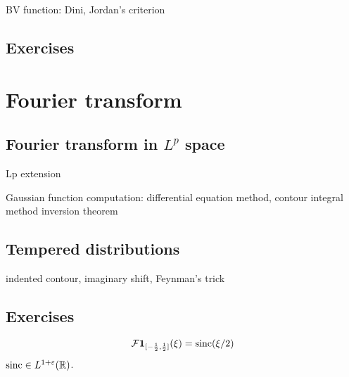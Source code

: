 \documentclass{../../large}
\begin{document}
BV function: Dini, Jordan's criterion
\begin{prb}
\end{prb}





\section*{Exercises}
\begin{prb}
\end{prb}
\begin{prb}
\end{prb}









\chapter{Fourier transform}
\section{Fourier transform in $L^p$ space}
\begin{prb}
\end{prb}
Lp extension

Gaussian function computation: differential equation method, contour integral method
inversion theorem
\begin{prb}
\end{prb}

\section{Tempered distributions}
\begin{prb}
indented contour, imaginary shift, Feynman's trick
\end{prb}







\section*{Exercises}
\begin{prb}
\[\mathcal{F}\mathbf{1}_{[-\frac12,\frac12]}(\xi)=\operatorname{sinc}(\xi/2)\]
$\operatorname{sinc}\in L^{1+\varepsilon}(\mathbb{R})$.
\end{prb}
\begin{prb}
\end{prb}
\begin{prb}
\end{prb}
\end{document}
